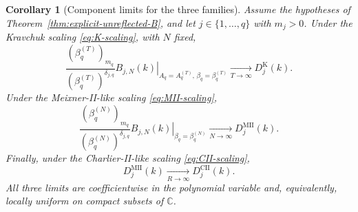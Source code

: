 \documentclass[10pt]{amsart}
\theoremstyle{plain}
\newtheorem{corollary}[theorem]{Corollary}
\theoremstyle{definition}
\theoremstyle{remark}
\begin{document}
\begin{corollary}[Component limits for the three families]
\label{cor:unreflected-component-limits}
Assume the hypotheses of Theorem~\ref{thm:explicit-unreflected-B}, and let
\(j\in\{1,\ldots,q\}\) with \(m_j>0\).
Under the Kravchuk scaling \eqref{eq:K-scaling}, with \(N\) fixed,
\begin{equation}
 \frac{(\beta_q^{(T)})_{m_q}}
      {(\beta_q^{(T)})^{\delta_{j,q}}}
 \left.B_{j,N}(k)\right|_{
 A_q=A_q^{(T)},\,\beta_q=\beta_q^{(T)}}
 \xrightarrow[T\to\infty]{}D_j^{\mathrm K}(k).
 \label{eq:Hahn-K-component-limit}
\end{equation}
Under the Meixner-II-like scaling \eqref{eq:MII-scaling},
\begin{equation}
 \frac{(\beta_q^{(N)})_{m_q}}
      {(\beta_q^{(N)})^{\delta_{j,q}}}
 \left.B_{j,N}(k)\right|_{\beta_q=\beta_q^{(N)}}
 \xrightarrow[N\to\infty]{}D_j^{\mathrm{MII}}(k).
 \label{eq:Hahn-MII-component-limit}
\end{equation}
Finally, under the Charlier-II-like scaling \eqref{eq:CII-scaling},
\begin{equation}
 D_j^{\mathrm{MII}}(k)\xrightarrow[R\to\infty]{}D_j^{\mathrm{CII}}(k).
 \label{eq:MII-CII-component-limit}
\end{equation}
All three limits are coefficientwise in the polynomial variable and,
equivalently, locally uniform on compact subsets of \(\mathbb C\).
\end{corollary}
\end{document}
